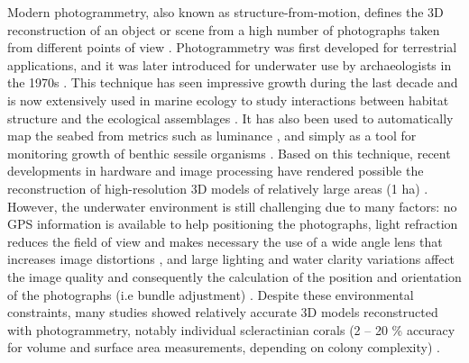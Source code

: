 Modern photogrammetry, also known as structure-from-motion, defines the 3D reconstruction of an object or scene from a high number of photographs taken from different points of view \citep{figueira_accuracy_2015}. Photogrammetry was first developed for terrestrial applications, and it was later introduced for underwater use by archaeologists in the 1970s \citep{drap_underwater_2012, pollio_applications_1968}. This technique has seen impressive growth during the last decade and is now extensively used in marine ecology to study interactions between habitat structure and the ecological assemblages \citep{darling_relationships_2017}. It has also been used to automatically map the seabed from metrics such as luminance \citep{mizuno_simple_2017}, and simply as a tool for monitoring growth of benthic sessile organisms \citep{abdo_efficiently_2006, bythell_three-dimensional_2001, chong_underwater_2002, gutierrez-heredia_simple_2015, holmes_estimating_2008, reichert_3d_2016}. Based on this technique, recent developments in hardware and image processing have rendered possible the reconstruction of high-resolution 3D models of relatively large areas (1 ha) \citep{friedman_multi-scale_2012, gonzalez-rivero_catlin_2014, leon_measuring_2015}. However, the underwater environment is still challenging due to many factors: no GPS information is available to help positioning the photographs, light refraction reduces the field of view and makes necessary the use of a wide angle lens that increases image distortions \citep{guo_accuracy_2016, menna_optical_2017}, and large lighting and water clarity variations affect the image quality and consequently the calculation of the position and orientation of the photographs (i.e bundle adjustment) \citep{bryson_characterization_2017}. Despite these environmental constraints, many studies showed relatively accurate 3D models reconstructed with photogrammetry, notably individual scleractinian corals (2 – 20 \% accuracy for volume and surface area measurements, depending on colony complexity) \citep{bythell_three-dimensional_2001, cocito_3-d_2003, courtney_estimating_2007, gutierrez-heredia_end_2016, lavy_quick_2015}.

